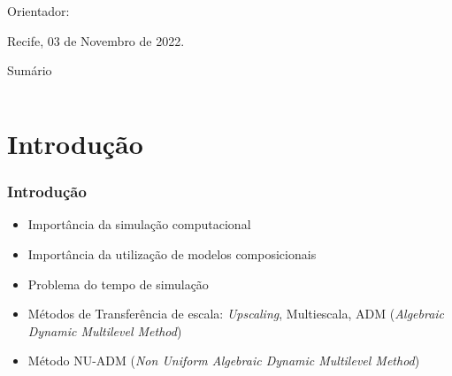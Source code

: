 \documentclass[professionalfont]{beamer}
\begin{document}
\begin{frame}
    \begin{minipage}{\textwidth}
        \begin{tcolorbox}[halign=center,
    valign=center,colupper=black,boxsep=1pt,width=\textwidth,colback={white},colbacktitle=yellow]    
            \Large \titulo
        \end{tcolorbox}
    \end{minipage}
    
    \vspace{0.3cm}
    
    \begin{minipage}{\textwidth}
        \autor
        
        Orientador: \orientador
    \end{minipage}
    
    \vfill
        
    Recife, 03 de Novembro de 2022.
    
    
    
    
\end{frame}

\begin{frame}{Sumário}
\begin{columns}[t]
        \begin{column}{.4\textwidth}
            \tableofcontents[sections={1-3}]
        \end{column}
        \begin{column}{.4\textwidth}
            \tableofcontents[sections={4-6}]
        \end{column}
    \end{columns}
\end{frame}

\section{Introdução}



\begin{frame}
\frametitle{Introdução}
\begin{itemize}
    \item Importância da simulação computacional
    \item Importância da utilização de modelos composicionais
    \item Problema do tempo de simulação
    \item Métodos de Transferência de escala: \textit{Upscaling}, Multiescala, ADM (\textit{Algebraic Dynamic Multilevel Method})
    \item Método NU-ADM (\textit{Non Uniform Algebraic Dynamic Multilevel Method})
\end{itemize}
\end{frame}
\end{document}

